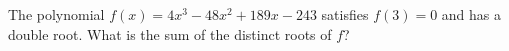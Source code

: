The polynomial $f(x)=4x^3-48x^2+189x-243$ satisfies $f(3)=0$ and has a double root. What is the sum of the distinct roots of $f$?
